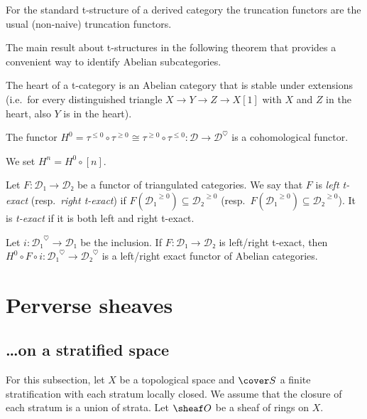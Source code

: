 \documentclass[english]{short-notes}
\renewcommand\cat{\mathscr}
\let\setset\cover
\begin{document}
\begin{Ex}
    For the standard t-structure of a derived category the truncation functors are the usual (non-naive) truncation functors.
\end{Ex}

The main result about t-structures in the following theorem that provides a convenient way to identify Abelian subcategories.

\begin{Thm}
    The heart of a t-category is an Abelian category that is stable under extensions (i.e.\ for every distinguished triangle $X → Y → Z → X[1]$ with $X$ and $Z$ in the heart, also $Y$ is in the heart).
\end{Thm}

\begin{Prop}
    The functor $H^0 = τ^{≤0} ∘ τ^{≥0} \cong τ^{≥0} ∘ τ^{≤0}\colon \cat D → \cat D^{\heartsuit}$ is a cohomological functor.
\end{Prop}

We set $H^n = H^0 ∘ [n]$.

\begin{Def}
    Let $F\colon \cat{D₁} → \cat{D₂}$ be a functor of triangulated categories.
    We say that $F$ is \emph{left t-exact} (resp.\ \emph{right t-exact}) if $F(\cat{D₁}^{≥0}) ⊆ \cat{D₂}^{≥0}$ (resp.\ $F(\cat{D₁}^{≥0}) ⊆ \cat{D₂}^{≥0}$).
    It is \emph{t-exact} if it is both left and right t-exact.
\end{Def}

\begin{Prop}
    Let $i\colon \cat{D₁}^\heartsuit → \cat{D₁}$ be the inclusion.
    If $F\colon \cat{D₁} → \cat{D₂}$ is left/right t-exact, then $H^0 ∘ F ∘ i\colon \cat{D₁}^\heartsuit → \cat{D₂}^\heartsuit$ is a left/right exact functor of Abelian categories.
\end{Prop}

\section{Perverse sheaves}

\subsection{\ldots on a stratified space}

For this subsection, let $X$ be a topological space and $\setset S$ a finite stratification with each stratum locally closed.
We assume that the closure of each stratum is a union of strata.
Let $\O$ be a sheaf of rings on $X$.
\end{document}
